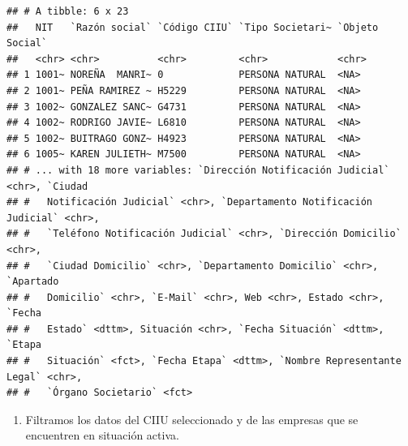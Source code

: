 \documentclass[
  11pt,
  a4paper,
]{book}
\providecommand{\tightlist}{%
  \setlength{\itemsep}{0pt}\setlength{\parskip}{0pt}}
\begin{document}
\begin{verbatim}
## # A tibble: 6 x 23
##   NIT   `Razón social` `Código CIIU` `Tipo Societari~ `Objeto Social`
##   <chr> <chr>          <chr>         <chr>            <chr>          
## 1 1001~ NOREÑA  MANRI~ 0             PERSONA NATURAL  <NA>           
## 2 1001~ PEÑA RAMIREZ ~ H5229         PERSONA NATURAL  <NA>           
## 3 1002~ GONZALEZ SANC~ G4731         PERSONA NATURAL  <NA>           
## 4 1002~ RODRIGO JAVIE~ L6810         PERSONA NATURAL  <NA>           
## 5 1002~ BUITRAGO GONZ~ H4923         PERSONA NATURAL  <NA>           
## 6 1005~ KAREN JULIETH~ M7500         PERSONA NATURAL  <NA>           
## # ... with 18 more variables: `Dirección Notificación Judicial` <chr>, `Ciudad
## #   Notificación Judicial` <chr>, `Departamento Notificación Judicial` <chr>,
## #   `Teléfono Notificación Judicial` <chr>, `Dirección Domicilio` <chr>,
## #   `Ciudad Domicilio` <chr>, `Departamento Domicilio` <chr>, `Apartado
## #   Domicilio` <chr>, `E-Mail` <chr>, Web <chr>, Estado <chr>, `Fecha
## #   Estado` <dttm>, Situación <chr>, `Fecha Situación` <dttm>, `Etapa
## #   Situación` <fct>, `Fecha Etapa` <dttm>, `Nombre Representante Legal` <chr>,
## #   `Órgano Societario` <fct>
\end{verbatim}

\begin{enumerate}
\def\labelenumi{\arabic{enumi}.}
\setcounter{enumi}{1}
\tightlist
\item
  Filtramos los datos del CIIU seleccionado y de las empresas que se
  encuentren en situación activa.
\end{enumerate}
\end{document}

